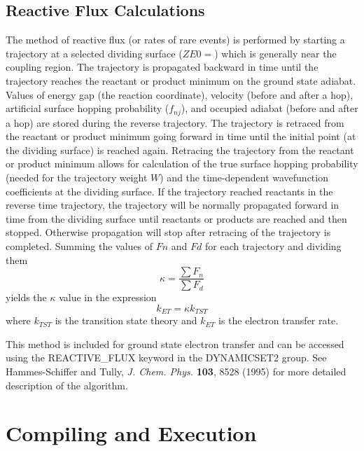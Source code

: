 \documentclass[oneside,11pt,openany]{book}
\begin{document}
\section{Reactive Flux Calculations}
The method of reactive flux (or rates of rare events) is performed by
starting a trajectory at a selected dividing surface ($ZE0=$) which is generally
near the coupling region.  The trajectory is propagated backward in time
until the trajectory reaches the reactant or product minimum on the ground
state adiabat.  Values of energy gap (the reaction coordinate), velocity (before and after a hop), 
artificial surface hopping probability ($f_{nj}$), and occupied adiabat (before and after a hop)
are stored during the reverse trajectory.  The trajectory is retraced from the reactant or product minimum going
forward in time until the initial point (at the dividing surface) is reached again.  
Retracing the trajectory from the reactant or
product minimum allows for calculation of the true surface hopping probability (needed for the trajectory weight $W$)
and the time-dependent wavefunction coefficients at the dividing surface.  If the trajectory reached reactants 
in the reverse time trajectory, the trajectory
will be normally propagated forward in time from the dividing surface until reactants or products are reached and then stopped.  Otherwise
propagation will stop after retracing of the trajectory is completed.
Summing the values of $Fn$ and $Fd$ for each trajectory and dividing them 
\begin{equation}
\kappa = \frac{\sum{F_n}}{\sum{F_d}}
\end{equation}
yields the $\kappa$ value in the expression
\begin{equation}
k_{ET} = \kappa k_{TST}
\end{equation}
where $k_{TST}$ is the transition state theory and $k_{ET}$ is the electron transfer rate.

This method is included for ground state electron transfer and can be accessed using the REACTIVE\_FLUX
keyword in the DYNAMICSET2 group.  See Hammes-Schiffer and Tully, \textit{J. Chem. Phys.} \textbf{103}, 8528 (1995)
for more detailed description of the algorithm.

\chapter{Compiling and Execution}
\end{document}
